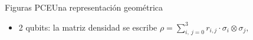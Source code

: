 \documentclass[xcolor=dvipsnames,presentation]{beamer}%
\begin{document}
\begin{frame}{Figuras PCE}{Una representación geométrica}
\begin{itemize}
	\item 2 qubits: la matriz densidad se escribe 
	$
		\rho=\sum_{i,\ j=0}^3r_{i,j}\cdot \sigma_i\otimes\sigma_j, 
	$
		
\resizebox{.75\textwidth}{!}{%
		\begin{minipage}{\textwidth}
		\begin{figure} %
		\begin{center}

\end{center}
\end{figure}
\end{minipage}}
\end{itemize}
\end{frame}
\end{document}
